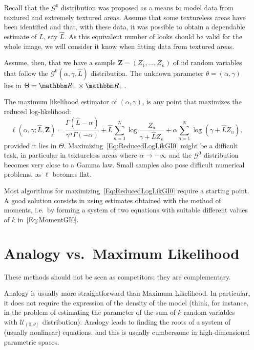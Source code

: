 Recall that the $\mathcal G^0$ distribution was proposed as a means to model data from textured and extremely textured areas.
Assume that some textureless areas have been identified and that, with these data, it was possible to obtain a dependable estimate of $L$, say $\widehat L$.
As this equivalent number of looks should be valid for the whole image, we will consider it know when fitting data from textured areas.

Assume, then, that we have a sample $\bm Z = (Z_1,\dots,Z_n)$ of iid random variables that follow the $\mathcal G^0(\alpha,\gamma,\widehat L)$ distribution.
The unknown parameter $\theta=(\alpha,\gamma)$ lies in $\Theta=\mathbbm R_- \times \mathbbm R_+$.

The maximum likelihood estimator of $(\alpha,\gamma)$, is any point that maximizes the reduced log-likelihood:
\begin{equation}
\ell(\alpha,\gamma;\widehat L, \bm Z) = 
\frac{\Gamma(\widehat L-\alpha)}{\gamma^\alpha \Gamma(-\alpha)} +
\widehat L \sum_{n=1}^N \log\frac{Z_n}{\gamma+\widehat L Z_n} + 
\alpha \sum_{n=1}^N \log(\gamma + \widehat L Z_n),
\label{Eq:ReducedLogLikGI0}
\end{equation}
provided it lies in $\Theta$.
Maximizing~\eqref{Eq:ReducedLogLikGI0} might be a difficult task, in particular in textureless areas where $\alpha\to-\infty$ and the $\mathcal G^0$ distribution becomes very close to a Gamma law.
Small samples also pose difficult numerical problems, as $\ell$ becomes flat\cite{FreryCribariSouza:JASP:04}.

Most algorithms for maximizing~\eqref{Eq:ReducedLogLikGI0} require a starting point.
A good solution consists in using estimates obtained with the method of moments, i.e.\ by forming a system of two equations with suitable different values of $k$ in~\eqref{Eq:MomentGI0}.

\section{Analogy vs.\ Maximum Likelihood}

These methods should not be seen as competitors; they are complementary.

Analogy is usually more straightforward than Maximum Likelihood.
In particular, it does not require the expression of the density of the model (think, for instance, in the problem of estimating the parameter of the sum of $k$ random variables with $\mathcal U_{(0,\theta)}$ distribution).
Analogy leads to finding the roots of a system of (usually nonlinear) equations, and this is usually cumbersome in high-dimensional parametric spaces.

